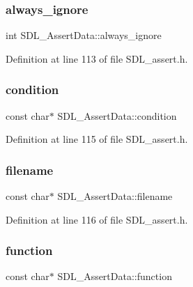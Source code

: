 \subsubsection{\texorpdfstring{always\_ignore}{always\_ignore}}
{\footnotesize\ttfamily int S\+D\+L\+\_\+\+Assert\+Data\+::always\+\_\+ignore}



Definition at line 113 of file S\+D\+L\+\_\+assert.\+h.

\mbox{\label{struct_s_d_l___assert_data_aec6d372462fa8c94a9d04c1168cd38c9}} 
\subsubsection{\texorpdfstring{condition}{condition}}
{\footnotesize\ttfamily const char$\ast$ S\+D\+L\+\_\+\+Assert\+Data\+::condition}



Definition at line 115 of file S\+D\+L\+\_\+assert.\+h.

\mbox{\label{struct_s_d_l___assert_data_acf27f593e6a436386d2cbcf826cf1ef7}} 
\subsubsection{\texorpdfstring{filename}{filename}}
{\footnotesize\ttfamily const char$\ast$ S\+D\+L\+\_\+\+Assert\+Data\+::filename}



Definition at line 116 of file S\+D\+L\+\_\+assert.\+h.

\mbox{\label{struct_s_d_l___assert_data_a4913c57d4affb813feea82fc5f48a25c}} 
\subsubsection{\texorpdfstring{function}{function}}
{\footnotesize\ttfamily const char$\ast$ S\+D\+L\+\_\+\+Assert\+Data\+::function}



